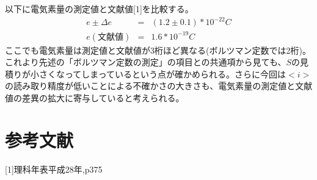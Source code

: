 \documentclass[11pt,a4j]{jsarticle}
\begin{document}
   以下に電気素量の測定値と文献値[1]を比較する。
   \begin{eqnarray}
   e \pm \Delta e &=& (1.2 \pm 0.1) * 10^{-22} C \nonumber \\
   e(文献値) &=& 1.6 * 10^{-19} C \nonumber
   \end{eqnarray}
   ここでも電気素量は測定値と文献値が3桁ほど異なる(ボルツマン定数では2桁)。これより先述の「ボルツマン定数の測定」の項目との共通項から見ても、$S$の見積りが小さくなってしまっているという点が確かめられる。さらに今回は$<i>$の読み取り精度が低いことによる不確かさの大きさも、電気素量の測定値と文献値の差異の拡大に寄与していると考えられる。
  
  
 \section{参考文献}
  [1]理科年表平成28年,p375
  
  
\end{document}
